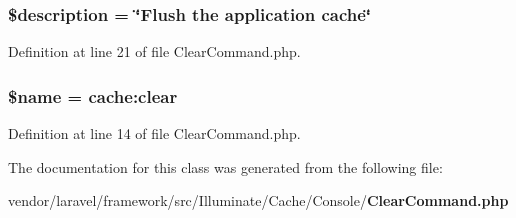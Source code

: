 \subsubsection[{\$description}]{\setlength{\rightskip}{0pt plus 5cm}\$description = \char`\"{}Flush the application cache\char`\"{}\hspace{0.3cm}{\ttfamily [protected]}}\label{class_illuminate_1_1_cache_1_1_console_1_1_clear_command_a87b032cba06009e3467abf1c8018d960}


Definition at line 21 of file Clear\+Command.\+php.

\subsubsection[{\$name}]{\setlength{\rightskip}{0pt plus 5cm}\${\bf name} = \textquotesingle{}cache\+:clear\textquotesingle{}\hspace{0.3cm}{\ttfamily [protected]}}\label{class_illuminate_1_1_cache_1_1_console_1_1_clear_command_ab2fc40d43824ea3e1ce5d86dee0d763b}


Definition at line 14 of file Clear\+Command.\+php.



The documentation for this class was generated from the following file\+:\begin{DoxyCompactItemize}
\item 
vendor/laravel/framework/src/\+Illuminate/\+Cache/\+Console/{\bf Clear\+Command.\+php}\end{DoxyCompactItemize}
